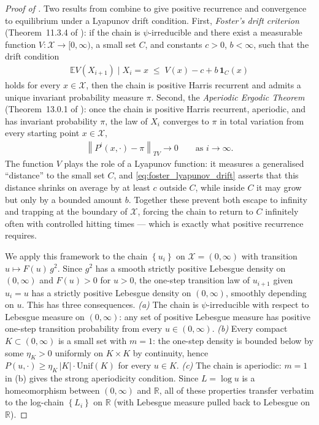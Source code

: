 \documentclass{article}
\newcommand{\RR}{\mathbb{R}}
\newcommand{\Set}[1]{\left\{ #1 \right\}}
\newcommand{\Exp}[1]{\mathbb{E} #1}
\newcommand{\norm}[1]{\left\|#1\right\|}
\newcommand{\cond}{\mid}
\newcommand{\mcX}{\mathcal{X}}
\begin{document}
\begin{proof}[Proof of ]
  Two results from \cite{meyn1993markov} combine to give positive recurrence and convergence to equilibrium under a Lyapunov drift condition. First, \emph{Foster's drift criterion} (Theorem~11.3.4 of \cite{meyn1993markov}): if the chain is $\psi$-irreducible and there exist a measurable function $V : \mcX \to [0, \infty)$, a small set $C$, and constants $c > 0$, $b < \infty$, such that the drift condition
  \begin{eqnarray}
    \label{eq:foster_lyapunov_drift}
    \Exp{V(X_{i+1}) \cond X_i = x} \;\le\; V(x) - c + b\,\mathbf{1}_C(x)
  \end{eqnarray}
  holds for every $x \in \mcX$, then the chain is positive Harris recurrent and admits a unique invariant probability measure $\pi$. Second, the \emph{Aperiodic Ergodic Theorem} (Theorem~13.0.1 of \cite{meyn1993markov}): once the chain is positive Harris recurrent, aperiodic, and has invariant probability $\pi$, the law of $X_i$ converges to $\pi$ in total variation from every starting point $x \in \mcX$,
  \begin{eqnarray*}
    \norm{P^i(x, \cdot) - \pi}_{TV} \to 0 \qquad \text{as } i \to \infty.
  \end{eqnarray*}
  The function $V$ plays the role of a Lyapunov function: it measures a generalised ``distance'' to the small set $C$, and \eqref{eq:foster_lyapunov_drift} asserts that this distance shrinks on average by at least $c$ outside $C$, while inside $C$ it may grow but only by a bounded amount $b$. Together these prevent both escape to infinity and trapping at the boundary of $\mcX$, forcing the chain to return to $C$ infinitely often with controlled hitting times --- which is exactly what positive recurrence requires.

  We apply this framework to the chain $\Set{u_i}$ on $\mcX = (0, \infty)$ with transition $u \mapsto F(u)\,g^2$. Since $g^2$ has a smooth strictly positive Lebesgue density on $(0,\infty)$ and $F(u) > 0$ for $u > 0$, the one-step transition law of $u_{i+1}$ given $u_i = u$ has a strictly positive Lebesgue density on $(0,\infty)$, smoothly depending on $u$. This has three consequences. \emph{(a)} The chain is $\psi$-irreducible with respect to Lebesgue measure on $(0, \infty)$: any set of positive Lebesgue measure has positive one-step transition probability from every $u \in (0,\infty)$. \emph{(b)} Every compact $K \subset (0,\infty)$ is a small set with $m = 1$: the one-step density is bounded below by some $\eta_K > 0$ uniformly on $K \times K$ by continuity, hence $P(u, \cdot) \ge \eta_K\,|K|\cdot \mathrm{Unif}(K)$ for every $u \in K$. \emph{(c)} The chain is aperiodic: $m = 1$ in (b) gives the strong aperiodicity condition. Since $L = \log u$ is a homeomorphism between $(0,\infty)$ and $\RR$, all of these properties transfer verbatim to the log-chain $\Set{L_i}$ on $\RR$ (with Lebesgue measure pulled back to Lebesgue on $\RR$).


\end{proof}
\end{document}
